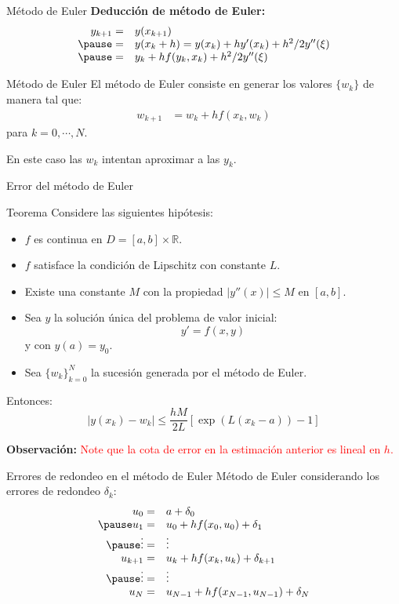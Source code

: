 \begin{frame}{Método de Euler}
\textbf{Deducción de método de Euler: }
\textcolor{red}{
\begin{displaymath}
\begin{array}{rl}
y_{k+1}=&y(x_{k+1})\\\pause
=&y(x_k+h)=y(x_k)+hy'(x_k)+h^2/2y''(\xi)\\\pause
=&y_k+hf(y_k,x_k)+h^2/2y''(\xi)
\end{array}
\end{displaymath}}\pause
\begin{block}{Método de Euler}
El método de Euler consiste en generar los valores $\{w_k\}$ de manera tal que:
\begin{align*}
w_{k+1}&=w_{k}+hf(x_k,w_k)
\end{align*}
para $k=0,\cdots,N$.
\end{block}
En este caso las $w_k$ intentan aproximar a las $y_k$.
\end{frame}
\begin{frame}{Error del método de Euler}
\begin{block}{Teorema}
Considere las siguientes hipótesis:
\begin{itemize}
\item $f$ es continua en $D=[a,b]\times \mathbb{R}$.
\item $f$ satisface la condición de Lipschitz con constante $L$.
\item Existe una constante $M$ con la propiedad $|y''(x)|\leq M$ en $[a,b]$.
\item Sea $y$ la solución única del problema de valor inicial:
$$y'=f(x,y)$$
y con $y(a)=y_0.$ 
\item Sea  $\{w_k\}_{k=0}^{N}$ la sucesión generada por el método de Euler.
\end{itemize}
Entonces:
$$|y(x_k)-w_k|\leq \dfrac{hM}{2L}[\exp(L(x_k-a))-1]$$
\end{block}
\textbf{Observación: }\textcolor{red}{Note que la cota de error en la estimación anterior es lineal en $h$.}
\end{frame}
\begin{frame}{Errores de redondeo en el método de Euler}
Método de Euler considerando los errores de redondeo $\delta_k$:
\begin{displaymath}
\begin{array}{rl}
u_0=&a+\delta_0\\\pause
u_1=&u_0+hf(x_0,u_0)+\delta_1\\\pause
\vdots =&\vdots\\
u_{k+1}=&u_{k}+hf(x_k,u_k)+\delta_{k+1}\\\pause
\vdots =&\vdots\\
u_{N}=&u_{N-1}+hf(x_{N-1},u_{N-1})+\delta_{N}
\end{array}
\end{displaymath}
\end{frame}
